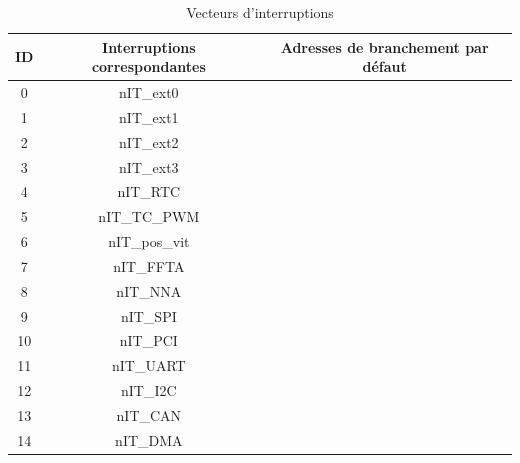 \begin{table}[H]
	\centering
	\begin{tabular}{|c|c|c|}
		\hline
		ID & Interruptions correspondantes & Adresses de branchement par défaut\\
		\hline
		0 & nIT\_ext0 & \\
		\hline
		1 & nIT\_ext1 & \\
		\hline
		2 & nIT\_ext2 & \\
		\hline
		3 & nIT\_ext3 &\\
		\hline
		4 & nIT\_RTC &\\
		\hline
		5 & nIT\_TC\_PWM &\\
		\hline
		6 & nIT\_pos\_vit &\\
		\hline
		7 & nIT\_FFTA &\\
		\hline
		8 & nIT\_NNA &\\
		\hline
		9 & nIT\_SPI &\\
		\hline
		10 & nIT\_PCI &\\
		\hline
		11 & nIT\_UART &\\
		\hline
		12 & nIT\_I2C &\\
		\hline
		13 & nIT\_CAN &\\
		\hline
		14 & nIT\_DMA &\\
		\hline
	\end{tabular}
	\caption{Vecteurs d'interruptions}
	\label{tab:vec_int}
\end{table}



